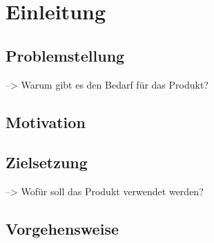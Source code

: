 \chapter{Einleitung}\label{einleitung}

\section{Problemstellung} \label{problemstellung}
--> Warum gibt es den Bedarf für das Produkt?




\section{Motivation} \label{motivation}


\section{Zielsetzung} \label{zielsetzung}
--> Wofür soll das Produkt verwendet werden?


\section{Vorgehensweise} \label{vorgehensweise}

